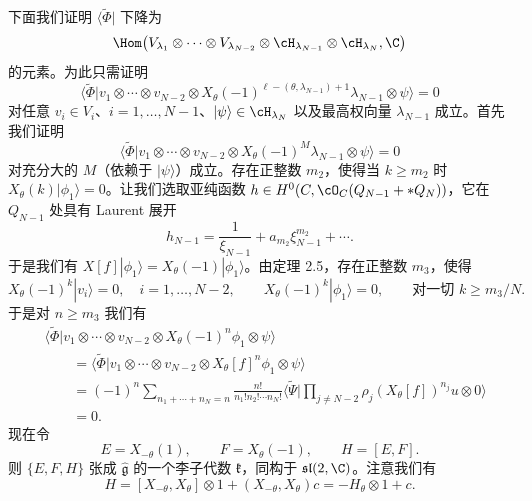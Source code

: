 下面我们证明 $\langle\tilde\Phi|$ 下降为
\[
\Hom\bigl(V_{\lambda_1}\otimes\cdots\otimes V_{\lambda_{N-2}}
\otimes\cH_{\lambda_{N-1}}\otimes\cH_{\lambda_N},\C\bigr)
\]
的元素。为此只需证明
\[
\langle\tilde\Phi|v_1\otimes\cdots\otimes v_{N-2}
\otimes X_\theta(-1)^{\ell-(\theta,\lambda_{N-1})+1}\lambda_{N-1}
\otimes\psi\rangle=0
\]
对任意 $v_i\in V_i$、$i=1,\dots,N-1$、$|\psi\rangle\in\cH_{\lambda_N}$
以及最高权向量 $\lambda_{N-1}$ 成立。首先我们证明
\[
\langle\tilde\Phi|v_1\otimes\cdots\otimes v_{N-2}
\otimes X_\theta(-1)^{M}\lambda_{N-1}\otimes\psi\rangle=0
\]
对充分大的 $M$（依赖于 $|\psi\rangle$）成立。存在正整数 $m_2$，使得当
$k\ge m_2$ 时 $X_\theta(k)|\phi_1\rangle=0$。让我们选取亚纯函数
$h\in H^0(C,\cO_C(Q_{N-1}+*Q_N))$，它在 $Q_{N-1}$ 处具有 Laurent 展开
\[
h_{N-1}=\frac{1}{\xi_{N-1}}+a_{m_2}\xi_{N-1}^{m_2}+\cdots.
\]
于是我们有 $X[f]|\phi_1\rangle=X_\theta(-1)|\phi_1\rangle$。由定理 2.5，存在正整数
$m_3$，使得
\[
X_\theta(-1)^{k}|v_i\rangle=0,\quad i=1,\dots,N-2,\qquad
X_\theta(-1)^{k}|\phi_1\rangle=0,\qquad\text{对一切 }k\ge m_3/N.
\]
于是对 $n\ge m_3$ 我们有
\[
\begin{aligned}
&\langle\tilde\Phi|v_1\otimes\cdots\otimes v_{N-2}
\otimes X_\theta(-1)^{n}\phi_1\otimes\psi\rangle\\
&\qquad=\langle\tilde\Phi|v_1\otimes\cdots\otimes v_{N-2}
\otimes X_\theta[f]^{n}\phi_1\otimes\psi\rangle\\
&\qquad=(-1)^{n}\sum_{n_1+\cdots+n_N=n}
\frac{n!}{n_1!n_2!\cdots n_N!}\langle\tilde\Psi|
\prod_{j\ne N-2}\rho_j(X_\theta[f])^{n_j}u\otimes0\rangle\\
&\qquad=0.
\end{aligned}
\]
现在令
\[
E=X_{-\theta}(1),\qquad F=X_\theta(-1),\qquad H=[E,F].
\]
则 $\{E,F,H\}$ 张成 $\hat{\mathfrak{g}}$ 的一个李子代数 $\mathfrak{k}$，同构于
$\mathfrak{sl}(2,\C)$。注意我们有
\[
H=[X_{-\theta},X_\theta]\otimes1+(X_{-\theta},X_\theta)c=-H_\theta\otimes1+c.
\]


